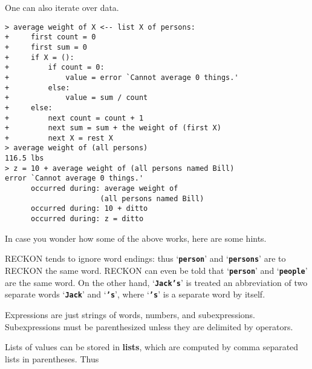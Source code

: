 \documentclass[12pt]{article}
\newcommand{\TT}[1]{{\tt \bfseries #1}}
\newcommand{\key}[1]{{\rm \bfseries #1}}
\newenvironment{indpar}[1][0.3in]%
	{\begin{list}{}%
		     {\setlength{\itemsep}{0in}%
		      \setlength{\topsep}{0in}%
		      \setlength{\parsep}{1ex}%
		      \setlength{\labelwidth}{#1}%
		      \setlength{\leftmargin}{#1}%
		      \addtolength{\leftmargin}{\labelsep}}%
	 \item}%
	{\end{list}}
\begin{document}
One can also iterate over data.

\begin{indpar}
\verb|> average weight of X <-- list X of persons:| \\
\verb|+     first count = 0| \\
\verb|+     first sum = 0| \\
\verb|+     if X = ():| \\
\verb|+         if count = 0:| \\
\verb|+             value = error `Cannot average 0 things.'| \\
\verb|+         else:| \\
\verb|+             value = sum / count| \\
\verb|+     else:| \\
\verb|+         next count = count + 1| \\
\verb|+         next sum = sum + the weight of (first X)| \\
\verb|+         next X = rest X| \\
\verb|> average weight of (all persons)| \\
\verb|116.5 lbs| \\
\verb|> z = 10 + average weight of (all persons named Bill)| \\
\verb|error `Cannot average 0 things.'| \\
\verb|      occurred during: average weight of| \\
\verb|                      (all persons named Bill)| \\
\verb|      occurred during: 10 + ditto| \\
\verb|      occurred during: z = ditto|
\end{indpar}

In case you wonder how some of the above works, here are some hints.

RECKON tends to ignore word endings: thus `\TT{person}' and
`\TT{persons}' are to RECKON the same word.
RECKON can even be told that `\TT{person}'
and `\TT{people}' are the same word.
On the other hand, `\TT{Jack's}' is treated an abbreviation
of two separate words `\TT{Jack}' and `\TT{'s}', where `\TT{'s}' is
a separate word by itself.

Expressions are just strings of words, numbers, and subexpressions.
Subexpressions must be parenthesized unless they
are delimited by operators.

Lists of values can be stored in \key{lists}, which are computed by comma
separated lists in parentheses.  Thus
\end{document}
